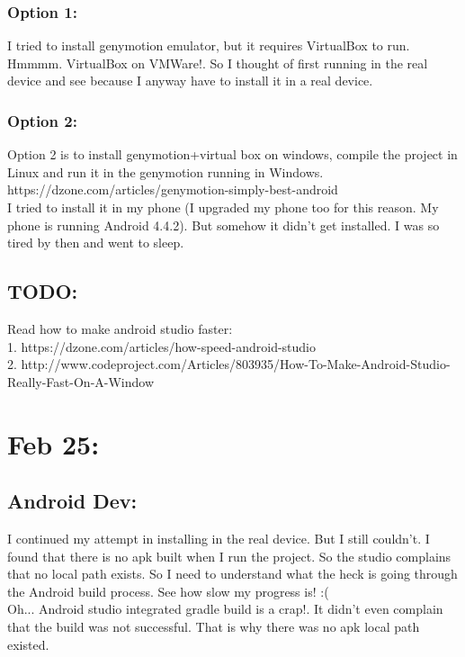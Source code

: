 \documentclass[11pt]{article}
\begin{document}
\subsubsection*{Option 1: } I tried to install genymotion emulator, but it requires VirtualBox to run. Hmmmm. VirtualBox on VMWare!. So I thought of 
first running in the real device and see because I anyway have to install it in a real device.

\subsubsection*{Option 2: } Option 2 is to install genymotion+virtual box on windows, compile the project in Linux and run it in the genymotion 
running in Windows. https://dzone.com/articles/genymotion-simply-best-android \\

I tried to install it in my phone (I upgraded my phone too for this reason. My phone is running Android 4.4.2). But somehow it didn't get installed.
I was so tired by then and went to sleep.\\

\subsection*{TODO:}
Read how to make android studio faster:\\
1. https://dzone.com/articles/how-speed-android-studio\\
2. http://www.codeproject.com/Articles/803935/How-To-Make-Android-Studio-Really-Fast-On-A-Window\\

\section*{Feb 25:}
\subsection*{Android Dev:}
I continued my attempt in installing in the real device. But I still couldn't.
I found that there is no apk built when I run the project. So the studio complains that no local path exists. So I need to understand what the heck 
is going through the Android build process. See how slow my progress is! :(\\

Oh... Android studio integrated gradle build is a crap!. It didn't even complain that the build was not successful. That is why there was no apk 
local path existed.\\
\end{document}
